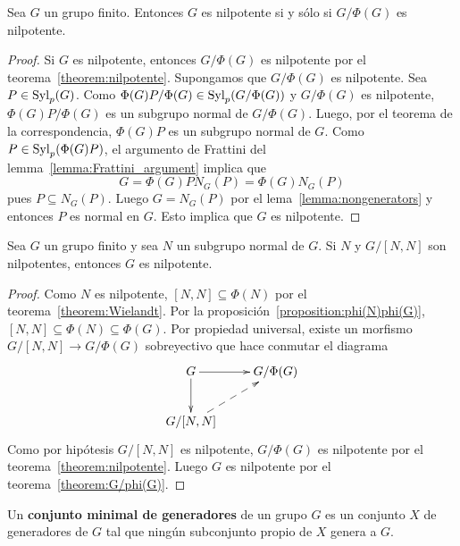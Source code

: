 \begin{theorem}
	\label{theorem:G/phi(G)}
	Sea $G$ un grupo finito. Entonces $G$ es nilpotente si y sólo si
	$G/\Phi(G)$ es nilpotente.
\end{theorem}
\begin{proof}
	Si $G$ es nilpotente, entonces $G/\Phi(G)$ es nilpotente por el
	teorema~\ref{theorem:nilpotente}. Supongamos que $G/\Phi(G)$ es
	nilpotente. Sea $P\in\mathrm{Syl}_p(G)$. Como
	$\Phi(G)P/\Phi(G)\in\mathrm{Syl}_p(G/\Phi(G))$ y $G/\Phi(G)$ es nilpotente,
	$\Phi(G)P/\Phi(G)$ es un subgrupo normal de $G/\Phi(G)$. Luego, por el
	teorema de la correspondencia, $\Phi(G)P$ es un subgrupo normal de $G$.
	Como $P\in\mathrm{Syl}_p(\Phi(G)P)$, el argumento de Frattini del
	lemma~\ref{lemma:Frattini_argument} implica que
	\[
		G=\Phi(G)PN_G(P)=\Phi(G)N_G(P)
	\]
	pues $P\subseteq N_G(P)$. Luego $G=N_G(P)$ por el
	lema~\ref{lemma:nongenerators} y entonces $P$ es normal en $G$. Esto
	implica que $G$ es nilpotente.
\end{proof}

\begin{theorem}[Hall]
	\label{theorem:Hall_nilpotente}
	Sea $G$ un grupo finito y sea $N$ un subgrupo normal de $G$. Si $N$ y
	$G/[N,N]$ son nilpotentes, entonces $G$ es nilpotente.
\end{theorem}

\begin{proof}
	Como $N$ es nilpotente, $[N,N]\subseteq\Phi(N)$ por el
	teorema~\ref{theorem:Wielandt}.	
	Por la proposición~\ref{proposition:phi(N)phi(G)},
	$[N,N]\subseteq\Phi(N)\subseteq\Phi(G)$. 
	Por propiedad universal, existe un morfismo
	$G/[N,N]\to G/\Phi(G)$ sobreyectivo que hace conmutar el diagrama
    \[
	\xymatrix{
	G
	\ar[d]
	\ar[r]
	& G/\Phi(G)
	\\
	G/[N,N]\ar@{-->}[ur]
	}
    \]
	Como por hipótesis $G/[N,N]$ es nilpotente, $G/\Phi(G)$ es nilpotente por
	el teorema~\ref{theorem:nilpotente}. Luego $G$ es nilpotente por el
	teorema~\ref{theorem:G/phi(G)}.
\end{proof}

\begin{definition}
	Un \textbf{conjunto minimal de generadores} de un grupo $G$ es un conjunto
	$X$ de generadores de $G$ tal que ningún subconjunto propio de $X$ genera a
	$G$.
\end{definition}

